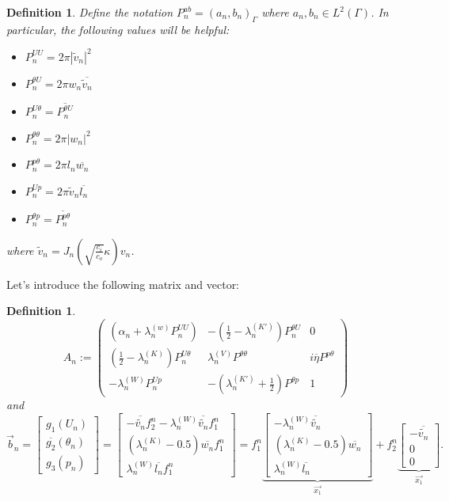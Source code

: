 \documentclass[10pt,journal,compsoc, onecolumn]{IEEEtran}
\newtheorem{definition}[theorem]{Definition}
\begin{document}
\begin{definition}
    Define the notation $P^{ab}_n = (a_n, b_n)_\Gamma$ where $a_n, b_n \in L^2(\Gamma)$. 
    In particular, the following values will be helpful: 
    \begin{itemize}
        \item $P^{UU}_n = 2\pi |\tilde v_n|^2$
        \item $P^{\theta U}_n = 2\pi w_n \overline{\tilde v_n}$
        \item $P^{U\theta}_n = \overline{P^{\theta U}_n}$
        \item $P^{\theta \theta}_n = 2 \pi |w_n|^2$
        \item $P^{p \theta}_n = 2\pi l_n\overline{w_n}$
        \item $P^{Up}_n = 2\pi \tilde v_n \overline{l_n}$
        \item $P^{\theta p}_n = \overline{P^{p\theta}_n }$
    \end{itemize}
    where $\tilde v_n = J_n(\sqrt{\frac{c_i}{c_o}}\kappa )v_n$.
\end{definition}
Let's introduce the following matrix and vector: 
\begin{definition}
    \label{def:galerkin_matrix}
    $$
    A_n:= 
    \begin{pmatrix}
        (\alpha_n + \lambda_n^{(w)} P^{UU}_n)  & - (\frac{1}{2} - \lambda_n^{(K')}) P_n^{\theta U} & 0\\
        (\frac{1}{2} - \lambda_n^{(K)})P^{U\theta}_n  & \lambda^{(V)}_n P^{\theta \theta}  &  i \overline{\eta}     P^{p \theta} \\
        -\lambda_n^{(W)} P^{Up}_n  &  - (\lambda^{(K')}_n + \frac{1}{2})  P^{\theta p} & 1 
    \end{pmatrix}
    $$
    and 
    $$
    \vec{b}_n = 
    \begin{bmatrix}
       g_1(U_n)\\
        \overline{g_2}(\theta_n) \\
        g_3(p_n)
    \end{bmatrix}
    = 
    \begin{bmatrix}
        - \overline{\tilde{v_n}} f_2^n - \lambda_n^{(W)} \overline{\tilde{v_n}} f_1^n \\
        (\lambda_n^{(K)} - 0.5)  \overline{w_n} f_1^n\\
        \lambda_n^{(W)} \overline{l_n} f_1^n
    \end{bmatrix}
= f_1^n 
\underbrace{
\begin{bmatrix}
- \lambda_n^{(W)} \overline{\tilde{v_n}} \\
(\lambda_n^{(K)} - 0.5) \overline{w_n}  \\
\lambda_n^{(W)} \overline{l_n}
\end{bmatrix}}_{\vec{x_1}}
+ f_2^n
\underbrace{\begin{bmatrix}
    - \overline{\tilde{v_n}} \\
    0 \\
    0
\end{bmatrix}}_{\vec{x_1}}.
    $$
\end{definition}
\end{document}
